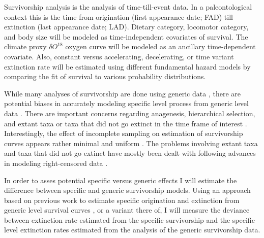 \documentclass[12pt,letterpaper]{article}
\begin{document}
Survivorship analysis is the analysis of time-till-event data. In a paleontological context this is the time from origination (first appearance date; FAD) till extinction (last appearance date; LAD). Dietary category, locomotor category, and body size will be modeled as time-independent covariates of survival. The climate proxy \(\delta O^{18}\) oxygen curve \citep{Zachos2008} will be modeled as an ancillary time-dependent covariate. Also, constant versus accelerating, decelerating, or time variant extinction rate will be estimated using different fundamental hazard models by comparing the fit of survival to various probability distributions.



While many analyses of survivorship are done using generic data \citep{Tomiya2013,Liow2008,Harnik2013}, there are potential biases in accurately modeling specific level process from generic level data \citep{Raup1975,Sepkoski1975,Simpson2006,Raup1991a,VanValen1979}. There are important concerns regarding anagenesis, hierarchical selection, and extant taxa or taxa that did not go extinct in the time frame of interest \citep{Raup1975,VanValen1979,Simpson2006,Raup1991a}. Interestingly, the effect of incomplete sampling on estimation of survivorship curves appears rather minimal and uniform \citep{Sepkoski1975}. The problems involving extant taxa and taxa that did not go extinct have mostly been dealt with following advances in modeling right-censored data \citep{Kleinbaum2005}.

In order to asses potential specific versus generic effects I will estimate the difference between specific and generic survivorship models. Using an approach based on previous work to estimate specific origination and extinction from generic level survival curves \citep{Foote1988}, or a variant there of, I will measure the deviance between extinction rate estimated from the specific survivorship and the specific level extinction rates estimated from the analysis of the generic survivorship data. 
\end{document}
